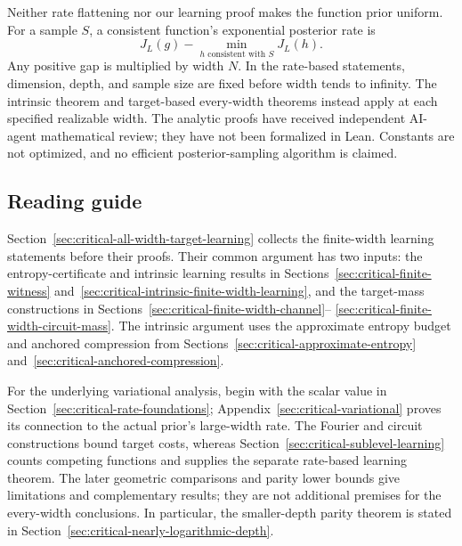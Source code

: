 \documentclass[11pt]{article}
\begin{document}
Neither rate flattening nor our learning proof makes the function
prior uniform. For a sample $S$, a consistent function's exponential
posterior rate is
\[
 J_L(g)-\min_{h\text{ consistent with }S}J_L(h).
\]
Any positive gap is multiplied by width $N$. In the rate-based
statements, dimension, depth, and sample size are fixed before width
tends to infinity. The intrinsic theorem and target-based every-width theorems instead
apply at each specified realizable width.
The analytic proofs have received independent AI-agent mathematical
review; they have not been formalized in Lean. Constants are not
optimized, and no efficient posterior-sampling algorithm is claimed.

\subsection{Reading guide}

Section~\ref{sec:critical-all-width-target-learning} collects the
finite-width learning statements before their proofs. Their common
argument has two inputs: the entropy-certificate and intrinsic learning
results in Sections~\ref{sec:critical-finite-witness}
and~\ref{sec:critical-intrinsic-finite-width-learning}, and the target-mass
constructions in Sections~\ref{sec:critical-finite-width-channel}--
\ref{sec:critical-finite-width-circuit-mass}. The intrinsic argument
uses the approximate entropy budget and anchored compression from
Sections~\ref{sec:critical-approximate-entropy}
and~\ref{sec:critical-anchored-compression}.

For the underlying variational analysis, begin with the scalar value in
Section~\ref{sec:critical-rate-foundations}; Appendix~\ref{sec:critical-variational}
proves its connection to the actual prior's large-width rate. The
Fourier and circuit constructions bound target costs, whereas
Section~\ref{sec:critical-sublevel-learning} counts competing functions
and supplies the separate rate-based learning theorem.
The later geometric comparisons and parity lower bounds give limitations
and complementary results; they are not additional premises for the
every-width conclusions. In particular, the smaller-depth parity theorem
is stated in Section~\ref{sec:critical-nearly-logarithmic-depth}.
\end{document}
